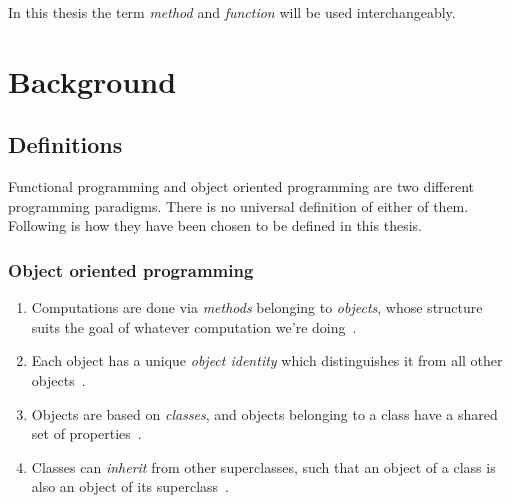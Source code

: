 \documentclass[a4paper,12pt]{article}
\begin{document}

In this thesis the term \textit{method} and \textit{function} will be used interchangeably.


\section{Background} \label{sec:background} %

\subsection{Definitions} \label{sub:definitions}
Functional programming and object oriented programming are two different programming paradigms. There is no universal definition of either of them. Following is how they have been chosen to be defined in this thesis.

\subsubsection{Object oriented programming} \label{ssub:object-oriented-programming} %

\begin{enumerate}
\item Computations are done via \textit{methods} belonging to \textit{objects}, whose structure suits the goal of whatever computation we're doing~\cite{john-m-chambers}.
\item Each object has a unique \textit{object identity} which distinguishes it from all other objects~\cite{khoshafian1986object}.
\item Objects are based on \emph{classes}, and objects belonging to a class have a shared set of properties~\cite{john-m-chambers}.
\item Classes can \emph{inherit} from other superclasses, such that an object of a class is also an object of its superclass~\cite{john-m-chambers}.
\end{enumerate}
\end{document}

